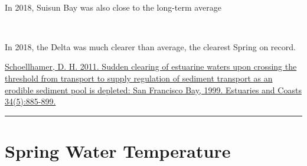 \documentclass[
]{book}
\begin{document}
\begin{panel-grid}
\begin{columns-nocenter}
\begin{column40}
~

\end{column40}

\begin{column800}

In 2018, Suisun Bay was also close to the long-term average

\end{column800}

\begin{column40}

~

\end{column40}

\begin{column800}

In 2018, the Delta was much clearer than average, the clearest Spring on record.

\end{column800}

\end{columns-nocenter}

\end{panel-grid}

\begin{disclaimer}
\href{https://link.springer.com/article/10.1007/s12237-011-9382-x}{Schoellhamer,
D. H. 2011. Sudden clearing of estuarine waters upon crossing the
threshold from transport to supply regulation of sediment transport as
an erodible sediment pool is depleted: San Francisco Bay, 1999.
Estuaries and Coasts 34(5):885-899.}
\end{disclaimer}

\begin{center}\rule{0.5\linewidth}{0.5pt}\end{center}

\hypertarget{spring-water-temperature}{%
\section{Spring Water Temperature}\label{spring-water-temperature}}
\end{document}
